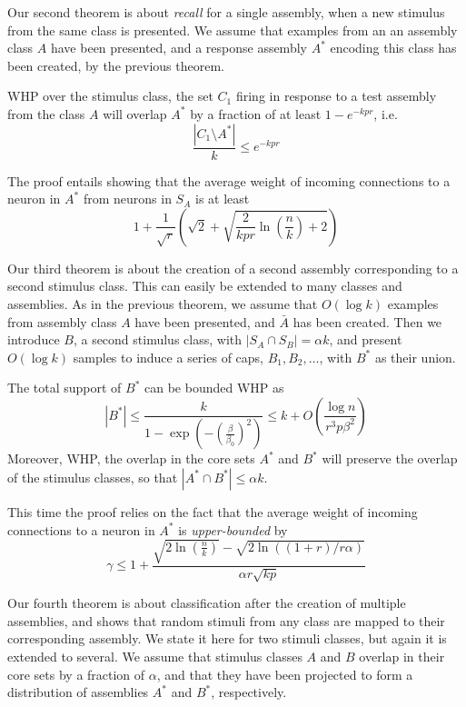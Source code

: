\documentclass[final,12pt]{colt2022} %
\newcommand{\assmcore}[1]{{#1}^*}
\newcommand{\stimcore}[1]{S_{#1}}
\newcommand{\support}[1]{\bar{#1}}
\begin{document}
\noindent Our second theorem is about {\em recall} for a single assembly, when a new stimulus from the same class is presented.  We assume that examples from an an assembly class $A$ have been presented, and a response assembly $A^*$ encoding this class has been created, by the previous theorem.  

\begin{theorem}[Recall] \label{theorem:recall}
WHP over the stimulus class, the set $C_1$ firing in response to a test assembly from the class $A$ will overlap $\assmcore{A}$ by a fraction of at least $1 - e^{-kpr}$, i.e. \[\frac{|C_1 \setminus \assmcore{A}|}{k} \leq e^{-kpr}\]
\end{theorem}
\noindent  The proof entails showing that the average weight of incoming connections to a neuron in $\assmcore{A}$ from neurons in $\stimcore{A}$ is at least \[1 + \frac{1}{\sqrt{r}}\left(\sqrt{2} + \sqrt{\frac{2}{kpr}\ln\left(\frac{n}{k}\right) + 2}\right)\]

\noindent Our third theorem is about the creation of a second assembly corresponding to a second stimulus class. This can easily be extended to many classes and assemblies.  As in the previous theorem, we assume that $O(\log k)$ examples from assembly class $A$ have been presented, and $\support{A}$ has been created.  Then we introduce $B$, a second stimulus class, with $|\stimcore{A} \cap \stimcore{B}| = \alpha k$, and present $O(\log k)$ samples to induce a series of caps, $B_1, B_2, \ldots$, with $B^*$ as their union.

\begin{theorem} \label{theorem:multiple}
The total support of $B^*$ can be bounded WHP as 
\[|B^*| \leq \frac{k}{1-\exp(-(\frac{\beta}{\beta_0})^2)} \leq k + O\left(\frac{\log n}{r^3p\beta^2}\right)\]
Moreover, WHP, the overlap in the core sets $\assmcore{A}$ and $\assmcore{B}$ will preserve the overlap of the stimulus classes, so that $|\assmcore{A} \cap \assmcore{B}| \leq \alpha k$.
\end{theorem}
This time the proof relies on the fact that the average weight of incoming connections to a neuron in $\assmcore{A}$ is {\em upper-bounded} by \[\gamma \leq 1 + \frac{\sqrt{2\ln\left(\frac{n}{k}\right)} - \sqrt{2\ln((1+r)/r\alpha)}}{\alpha r \sqrt{kp}}\] 

\noindent Our fourth theorem is about classification after the creation of multiple assemblies, and shows that random stimuli from any class are mapped to their corresponding assembly. We state it here for two stimuli classes, but again it is extended to several. We assume that stimulus classes $A$ and $B$ overlap in their core sets by a fraction of $\alpha$, and that they have been projected to form a distribution of assemblies $\assmcore{A}$ and $\assmcore{B}$, respectively.
\end{document}
